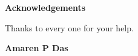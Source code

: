 \doublespacing
\newpage
\thispagestyle{empty}
\mbox{}

\newpage
\thispagestyle{empty}

\begin{center}
\textbf{\Large{Acknowledgements}}
\bigskip
\bigskip


Thanks to every one for your help.

\end{center}

\bigskip
\bigskip
\bigskip
\bigskip

\hfill \textbf{Amaren P Das}

\restoregeometry
